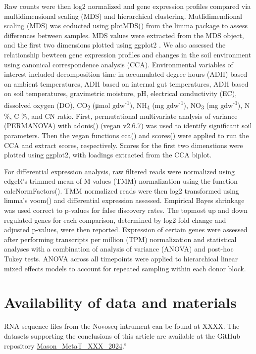 \documentclass[
  sn-nature,
  lineno, referee]{sn-jnl}
\begin{document}
Raw counts were then log2 normalized and gene expression profiles
compared via multidimensional scaling (MDS) and hierarchical clustering.
Mutlidimendional scaling (MDS) was coducted using plotMDS() from the
limma package to assess differences between samples. MDS values were
extracted from the MDS object, and the first two dimensions plotted
using ggplot2 \citep{wickham_ggplot2_2016}. We also assessed the
relationship bewteen gene expression profiles and changes in the soil
environment using canonical correspondence analysis (CCA). Environmental
variables of interest included decomposition time in accumulated degree
hours (ADH) based on ambient temperatures, ADH based on internal gut
temperatures, ADH based on soil temperatures, gravimetric moisture, pH,
electrical conductivity (EC), dissolved oxygen (DO), CO\textsubscript{2}
(μmol gdw\textsuperscript{-1}), NH\textsubscript{4} (mg
gdw\textsuperscript{-1}), NO\textsubscript{3} (mg
gdw\textsuperscript{-1}), N \%, C \%, and CN ratio. First, permutational
multivariate analysis of variance (PERMANOVA) with adonis() (vegan
v2.6.7) \citep{oksanen_vegan_2024} was used to identify significant soil
parameters. Then the vegan functions cca() and scores() were applied to
run the CCA and extract scores, respectively. Scores for the first two
dimenstions were plotted using ggplot2, with loadings extracted from the
CCA biplot.

For differential expression analysis, raw filtered reads were normalized
using edgeR's trimmed mean of M values (TMM) normalization using the
function calcNormFactors(). TMM normalized reads were then log2
transformed using limma's voom() and differential expression assessed.
Empirical Bayes shrinkage was used correct to p-values for false
discovery rates. The topmost up and down regulated genes for each
comparison, determined by log2 fold change and adjusted p-values, were
then reported. Expression of certain genes were assessed after
performing transcripts per million (TPM) normalization and statistical
analyses with a combination of analysis of variance (ANOVA) and post-hoc
Tukey tests. ANOVA across all timepoints were applied to hierarchical
linear mixed effects models to account for repeated sampling within each
donor block.

\section{Availability of data and
materials}\label{availability-of-data-and-materials}

RNA sequence files from the Novoseq intrument can be found at XXXX. The
datasets supporting the conclusions of this article are available at the
GitHub repository
\href{https://github.com/amason30/Mason_MetaT_XXX_2024}{Mason\_MetaT\_XXX\_2024}.''
\end{document}
